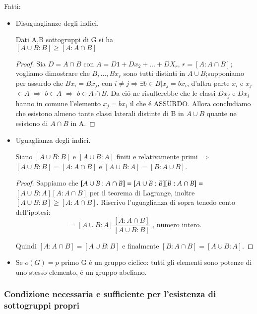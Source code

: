 \documentclass[oneside,12pt]{memoir}
\begin{document}
Fatti:
\begin{itemize}
\item Disuguaglianze degli indici.

Dati A,B sottogruppi di G si ha\\
$[A\cup B:B]\geq[A:A\cap B]$
\begin{proof}
Sia $D=A\cap B$ con $A=D1+Dx_2+\ldots+DX_r$, $r=[A:A\cap B]$; vogliamo dimostrare che $B,\ldots,Bx_r$ sono tutti distinti in $A\cup B$;supponiamo per assurdo che $Bx_i=Bx_j$, con $i\neq j \Rightarrow \exists b\in B | x_j=bx_i$, d'altra parte $x_i$ e $x_j$ $\in A$ $\Rightarrow$ $b\in A$ $\Rightarrow$ $b\in A\cap B$. Da ci\'o ne risulterebbe che le classi $Dx_j$ e $Dx_i$ hanno in comune l'elemento $x_j=bx_i$ il che \'e  ASSURDO. Allora concludiamo che esistono almeno tante classi laterali distinte di B in $A\cup B$ quante ne esistono di $A\cap B$ in A.

\end{proof}

\item Uguaglianza degli indici.


Siano $[A\cup B:B]$ e $[A\cup B:A]$ finiti e relativamente primi $\Rightarrow$ $[A\cup B:B]=[A:A\cap B]$ e $[A\cup B:A]=[B:A\cup B]$.
\begin{proof}
Sappiamo che $[A\cup B:A\cap B]=\-[A\cup B:B][B:A\cap B]=$ \mbox{$[A\cup B:A][A:A\cap B]$} per il teorema di Lagrange, inoltre $[A\cup B:B]\geq [A:A\cap B]$.
Riscrivo l'uguaglianza di sopra tenedo conto dell'ipotesi: 
\begin{equation*}
[B:A\cap B]=[A\cup B:A]\frac{[A:A\cap B]}{[A\cup B:B]}  \textrm{ , numero intero.}
\end{equation*}

Quindi $[A:A\cap B]=[A\cup B:B]$ e finalmente $[B:A\cap B]=[A\cup B:A]$.

\end{proof}

\item Se $o(G)=p$ primo G \'e un gruppo ciclico: tutti gli elementi sono potenze di uno stesso elemento, \'e un gruppo abeliano.


\end{itemize}


\subsubsection{Condizione necessaria e sufficiente per l'esistenza di sottogruppi propri}
\end{document}
